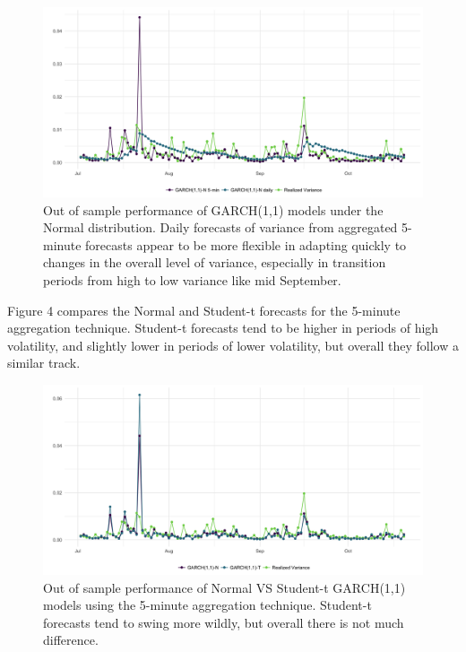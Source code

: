 \documentclass[10pt,twoside,printwatermark=false]{pinp}
\begin{document}
\begin{figure}
  \begin{center}
    \includegraphics[width=1.00\textwidth]{../../visualizations/compare_normal_forecasts} 
  \end{center}
  \caption{Out of sample performance of GARCH(1,1) models under the Normal distribution. Daily forecasts of variance from aggregated 5-minute forecasts appear to be more flexible in adapting quickly to changes in the overall level of variance, especially in transition periods from high to low variance like mid September.}\label{fig}
\end{figure}

Figure 4 compares the Normal and Student-t forecasts for the 5-minute
aggregation technique. Student-t forecasts tend to be higher in periods
of high volatility, and slightly lower in periods of lower volatility,
but overall they follow a similar track.

\begin{figure}
  \begin{center}
    \includegraphics[width=1.00\textwidth]{../../visualizations/compare_normal_vs_student_forecasts} 
  \end{center}
  \caption{Out of sample performance of Normal VS Student-t GARCH(1,1) models
  using the 5-minute aggregation technique. Student-t forecasts tend to swing
  more wildly, but overall there is not much difference.}\label{fig}
\end{figure}
\end{document}
